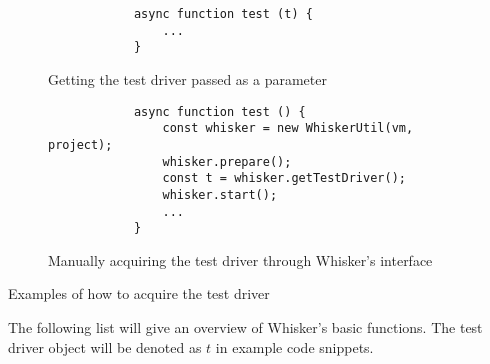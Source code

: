 \begin{listing}[htpb]
    \centering
    \begin{subfigure}[b]{.35\textwidth}
        \begin{verbatim}
            async function test (t) {
                ...
            }
        \end{verbatim}
        \vspace{-\bigskipamount}
        \caption{Getting the test driver passed as a parameter}
    \end{subfigure}
    \hspace{.05\textwidth}
    \begin{subfigure}[b]{.50\textwidth}
        \begin{verbatim}
            async function test () {
                const whisker = new WhiskerUtil(vm, project);
                whisker.prepare();
                const t = whisker.getTestDriver();
                whisker.start();
                ...
            }
        \end{verbatim}
        \vspace{-\bigskipamount}
        \caption{Manually acquiring the test driver through Whisker's interface}
    \end{subfigure}
    \caption{Examples of how to acquire the test driver}
    \label{fig:examples_of_how_to_acquire_the_test_driver}
\end{listing}

The following list will give an overview of Whisker's basic functions.
The test driver object will be denoted as $t$ in example code snippets.

